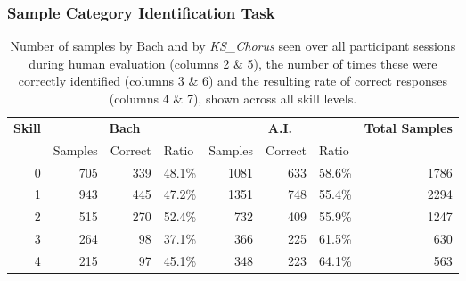 \documentclass{article}
\begin{document}
\subsubsection{Sample Category Identification Task}

\begin{table}
\centering
\caption{Number of samples by Bach and by \textit{KS\_Chorus} seen over all participant sessions during human evaluation (columns 2 \& 5), the number of times these were correctly identified (columns 3 \& 6) and the resulting rate of correct responses (columns 4 \& 7), shown across all skill levels.\newline}
\label{tab:humaneval}
\begin{tabular}{rrrrrrrr}
\multicolumn{1}{l}{\textbf{Skill}} & \multicolumn{3}{c}{\textbf{Bach}}                                                     & \multicolumn{3}{c}{\textbf{A.I.}}                                                     & \multicolumn{1}{l}{\textbf{Total Samples}}  \\
\multicolumn{1}{l}{}               & \multicolumn{1}{l}{Samples} & \multicolumn{1}{l}{Correct} & \multicolumn{1}{l}{Ratio} & \multicolumn{1}{l}{Samples} & \multicolumn{1}{l}{Correct} & \multicolumn{1}{l}{Ratio} & \multicolumn{1}{l}{}                        \\ 
\hline\hline
0                                  & 705                         & 339                         & 48.1\%                    & 1081                        & 633                         & 58.6\%                    & 1786                                        \\
1                                  & 943                         & 445                         & 47.2\%                    & 1351                        & 748                         & 55.4\%                    & 2294                                        \\
2                                  & 515                         & 270                         & 52.4\%                    & 732                         & 409                         & 55.9\%                    & 1247                                        \\
3                                  & 264                         & 98                          & 37.1\%                    & 366                         & 225                         & 61.5\%                    & 630                                         \\
4                                  & 215                         & 97                          & 45.1\%                    & 348                         & 223                         & 64.1\%                    & 563                                         \\

\end{tabular}
\end{table}
\end{document}
